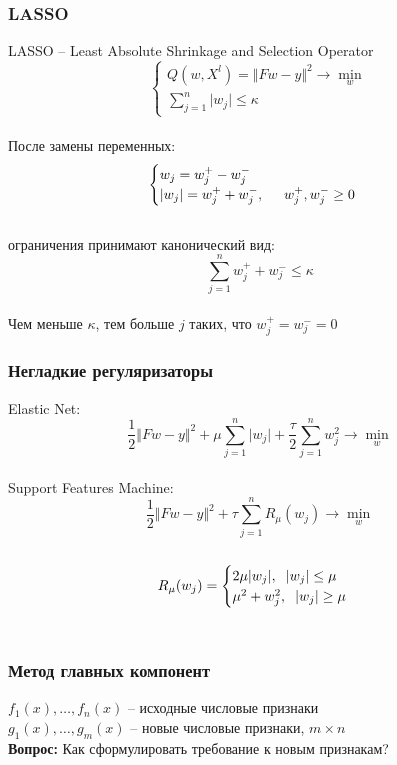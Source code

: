 \documentclass[10pt]{beamer}
\begin{document}
\begin{frame}\frametitle{LASSO}
LASSO -- Least Absolute Shrinkage and Selection Operator\\
$$
\begin{cases} Q(w,X^l) = \Vert Fw - y \Vert^2 \rightarrow \min\limits_{w} \\
\sum_{j=1}^n \vert w_j \vert \leq \kappa
\end{cases}
$$\\
После замены переменных:\\
$$
\begin{cases} w_j = w_j^+ - w_j^-\\
\vert w_j \vert = w_j^+ + w_j^-, \hspace{5mm} w_j^+, w_j^- \geq 0\\

\end{cases}
$$\\
ограничения принимают канонический вид:\\
$$\sum\limits_{j=1}^n w_j^+ + w_j^- \leq \kappa$$\\
Чем меньше $\kappa$, тем больше $j$ таких, что $w_j^+ = w_j^- = 0$\\
\end{frame}

\begin{frame}\frametitle{Негладкие регуляризаторы}
Elastic Net:\\
$$\frac{1}{2} \Vert Fw - y \Vert^2 + \mu \sum\limits_{j=1}^n \vert w_j \vert + \frac{\tau}{2} \sum\limits_{j=1}^n w_j^2 \rightarrow \min\limits_{w}$$\\
Support Features Machine:\\
$$\frac{1}{2} \Vert Fw - y \Vert^2 + \tau \sum\limits_{j=1}^n R_{\mu}(w_j) \rightarrow \min\limits_{w}$$\\
$$ R_{\mu}(w_j) = \begin{cases} 2 \mu \vert w_j \vert, \hspace{2mm} \vert w_j \vert \leq \mu\\
\mu^2 + w_j^2, \hspace{2mm} \vert w_j \vert \geq \mu
\end{cases}$$\\
\end{frame}

\begin{frame}\frametitle{Метод главных компонент}
$f_1(x), \dots, f_n(x)$ -- исходные числовые признаки\\
$g_1(x), \dots, g_m(x)$ -- новые числовые признаки, $m \times n$\\
\vspace{5mm}
\textbf{Вопрос:} Как сформулировать требование к новым признакам?
\end{frame}
\end{document}
